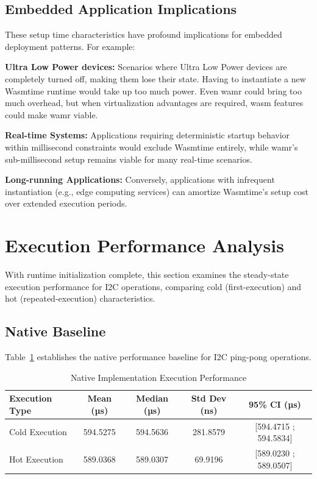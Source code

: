 \subsection{Embedded Application Implications}
\label{subsec:setup-implications}

These setup time characteristics have profound implications for embedded deployment patterns. For example:

\textbf{Ultra Low Power devices:} Scenarios where Ultra Low Power devices are completely turned off, making them lose their state. Having to instantiate a new Wasmtime runtime would take up too much power. Even \acrshort{wamr} could bring too much overhead, but when virtualization advantages are required, \acrshort{wasm} features could make \acrshort{wamr} viable.

\textbf{Real-time Systems:} Applications requiring deterministic startup behavior within millisecond constraints would exclude Wasmtime entirely, while \acrshort{wamr}'s sub-millisecond setup remains viable for many real-time scenarios.

\textbf{Long-running Applications:} Conversely, applications with infrequent instantiation (e.g., edge computing services) can amortize Wasmtime's setup cost over extended execution periods.

\section{Execution Performance Analysis}
\label{sec:eval-execution}

With runtime initialization complete, this section examines the steady-state execution performance for I2C operations, comparing cold (first-execution) and hot (repeated-execution) characteristics.

\subsection{Native Baseline}
\label{subsec:eval-execution-native}

Table~\ref{tab:native-execution} establishes the native performance baseline for I2C ping-pong operations.

\begin{table}[h]
    \centering
    \caption{Native Implementation Execution Performance}
    \label{tab:native-execution}
    \begin{tabular}{lcccc}
        \toprule
        \textbf{Execution Type} & \textbf{Mean (µs)} & \textbf{Median (µs)} & \textbf{Std Dev (ns)} & \textbf{95\% CI (µs)} \\
        \midrule
        Cold Execution  & 594.5275 & 594.5636 & 281.8579 & [594.4715 ; 594.5834] \\
        Hot Execution   & 589.0368 & 589.0307 & 69.9196 & [589.0230 ; 589.0507] \\
    \end{tabular}
\end{table}

